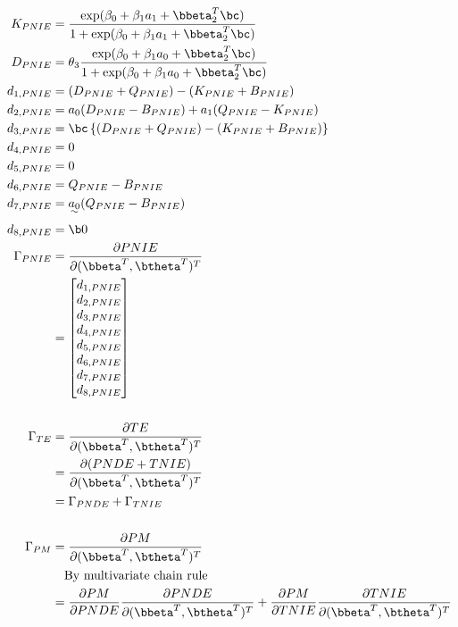 \documentclass[dvipdfmx,10pt]{article}
\begin{document}
\begin{align*}
  K_{PNIE} &= \frac
      {    \exp(\beta_{0} + \beta_{1}a_{1} + \bbeta_{2}^{T}\bc)}
      {1 + \exp(\beta_{0} + \beta_{1}a_{1} + \bbeta_{2}^{T}\bc)}\\
  D_{PNIE} &= \theta_{3} \frac
      {    \exp(\beta_{0} + \beta_{1}a_{0} + \bbeta_{2}^{T}\bc)}
      {1 + \exp(\beta_{0} + \beta_{1}a_{0} + \bbeta_{2}^{T}\bc)}\\
  d_{1,PNIE} &= (D_{PNIE} + Q_{PNIE}) - (K_{PNIE} + B_{PNIE})\\
  d_{2,PNIE} &= a_{0}(D_{PNIE} - B_{PNIE}) + a_{1}(Q_{PNIE} - K_{PNIE})\\
  d_{3,PNIE} &= \bc \left\{ (D_{PNIE} + Q_{PNIE}) - (K_{PNIE} + B_{PNIE}) \right\}\\
  d_{4,PNIE} &= 0\\
  d_{5,PNIE} &= 0\\
  d_{6,PNIE} &= Q_{PNIE} - B_{PNIE}\\
  d_{7,PNIE} &= \uwave{a_{0}} (Q_{PNIE} - B_{PNIE})\\
  d_{8,PNIE} &= \b0\\
  \Gamma_{PNIE}
  &= \frac{\partial PNIE}{\partial (\bbeta^{T},\btheta^{T})^{T}}\\
  &= \begin{bmatrix}
      d_{1,PNIE}\\
      d_{2,PNIE}\\
      d_{3,PNIE}\\
      d_{4,PNIE}\\
      d_{5,PNIE}\\
      d_{6,PNIE}\\
      d_{7,PNIE}\\
      d_{8,PNIE}\\
    \end{bmatrix}\\
  \\
  \Gamma_{TE}
  &= \frac{\partial TE}{\partial (\bbeta^{T},\btheta^{T})^{T}}\\
  &= \frac{\partial (PNDE+TNIE)}{\partial (\bbeta^{T},\btheta^{T})^{T}}\\
  &= \Gamma_{PNDE} + \Gamma_{TNIE}\\
  \\
  \Gamma_{PM}
  &= \frac{\partial PM}{\partial (\bbeta^{T},\btheta^{T})^{T}}\\
  &~~~\text{By multivariate chain rule}\\
  &= \frac{\partial PM}{\partial PNDE}\frac{\partial PNDE}{\partial (\bbeta^{T},\btheta^{T})^{T}} + \frac{\partial PM}{\partial TNIE}\frac{\partial TNIE}{\partial (\bbeta^{T},\btheta^{T})^{T}}\\

\end{align*}
\end{document}
